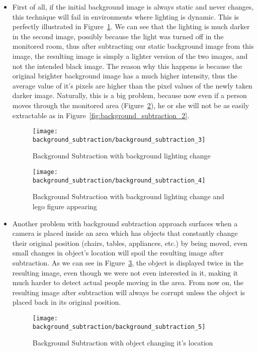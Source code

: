 	\begin{itemize}	
	\item First of all, if the initial background image is always static and never changes, this technique will fail in environments where lighting is dynamic. This is perfectly illustrated in Figure~\ref{fig:background_subtraction_3}. We can see that the lighting is much darker in the second image, possibly because the light was turned off in the monitored room, thus after subtracting our static background image from this image, the resulting image is simply a lighter version of the two images, and not the intended black image. The reason why this happens is because the original brighter background image has a much higher intensity, thus the average value of it's pixels are higher than the pixel values of the newly taken darker image. Naturally, this is a big problem, because now even if a person moves through the monitored area (Figure~\ref{fig:background_subtraction_4}), he or she will not be as easily extractable as in Figure~\ref{fig:background_subtraction_2}.
	\begin{figure}[ht]
		\centering
		\texttt{[image: background\_subtraction/background\_subtraction\_3]}
		\caption{Background Subtraction with background lighting change}
		\label{fig:background_subtraction_3}
	\end{figure}
	\begin{figure}[ht]
		\centering
		\texttt{[image: background\_subtraction/background\_subtraction\_4]}
		\caption{Background Subtraction with background lighting change and lego figure appearing}
		\label{fig:background_subtraction_4}
	\end{figure}
	
	\item Another problem with background subtraction approach surfaces when a camera is placed inside an area which has objects that constantly change their original position (chairs, tables, appliances, etc.) by being moved, even small changes in object's location will spoil the resulting image after subtraction. As we can see in Figure~\ref{fig:background_subtraction_5}, the object is displayed twice in the resulting image, even though we were not even interested in it, making it much harder to detect actual people moving in the area. From now on, the resulting image after subtraction will always be corrupt unless the object is placed back in its original position.
	\begin{figure}[ht]
		\centering
		\texttt{[image: background\_subtraction/background\_subtraction\_5]}
		\caption{Background Subtraction with object changing it's location}
		\label{fig:background_subtraction_5}
	\end{figure}
	\end{itemize}
	

